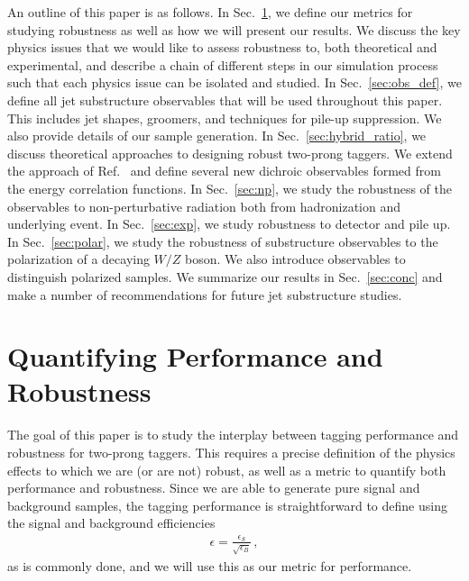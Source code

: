 \documentclass[11pt,letterpaper]{article}
\DeclareRobustCommand{\Sec}[1]{Sec.~\ref{#1}}
\DeclareRobustCommand{\Ref}[1]{Ref.~\cite{#1}}
\begin{document}
An outline of this paper is as follows.
%
In \Sec{sec:pres}, we define our metrics for studying robustness as well as how we will present our results.
%
We discuss the key physics issues that we would like to assess robustness to, both theoretical and experimental, and describe a chain of different steps in our simulation process such that each physics issue can be isolated and studied.
%
In \Sec{sec:obs_def}, we define all jet substructure observables that will be used throughout this paper.
%
This includes jet shapes, groomers, and techniques for pile-up suppression. We also provide details of our sample generation.
%
In \Sec{sec:hybrid_ratio}, we discuss theoretical approaches to designing robust two-prong taggers.
%
We extend the approach of \Ref{Salam:2016yht} and define several new dichroic observables formed from the energy correlation functions.  
%
In \Sec{sec:np}, we study the robustness of the observables to non-perturbative radiation both from hadronization and underlying event.
%
In \Sec{sec:exp}, we study robustness to detector and pile up.
%
In \Sec{sec:polar}, we study the robustness of substructure observables to the polarization of a decaying $W/Z$ boson.
%
We also introduce observables to distinguish polarized samples.
%
We summarize our results in \Sec{sec:conc} and make a number of recommendations for future jet substructure studies.

\section{Quantifying Performance and Robustness}\label{sec:pres}


The goal of this paper is to study the interplay between tagging performance and robustness for two-prong taggers.
%
This requires a precise definition of the physics effects to which we are (or are not) robust, as well as a metric to quantify both performance and robustness.
%
Since we are able to generate pure signal and background samples, the tagging performance is straightforward to define using the signal and background efficiencies 
\begin{align}
\epsilon=\frac{\epsilon_S}{\sqrt{\epsilon_B}}\,,
\end{align}
as is commonly done, and we will use this as our metric for performance.
\end{document}
